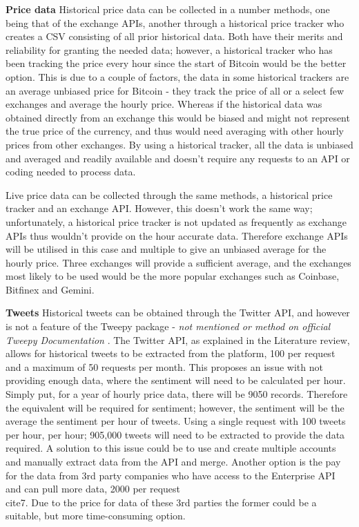 \documentclass[oneside, 12pt]{article}
\begin{document}
		\textbf{Price data}
		\newline
		\newline
		Historical price data can be collected in a number methods, one being that of the exchange APIs, another through a historical price tracker who creates a CSV consisting of all prior historical data. Both have their merits and reliability for granting the needed data; however, a historical tracker who has been tracking the price every hour since the start of Bitcoin would be the better option. This is due to a couple of factors, the data in some historical trackers are an average unbiased price for Bitcoin - they track the price of all or a select few exchanges and average the hourly price. Whereas if the historical data was obtained directly from an exchange this would be biased and might not represent the true price of the currency, and thus would need averaging with other hourly prices from other exchanges. By using a historical tracker, all the data is unbiased and averaged and readily available and doesn't require any requests to an API or coding needed to process data.
		
		Live price data can be collected through the same methods, a historical price tracker and an exchange API. However, this doesn't work the same way; unfortunately, a historical price tracker is not updated as frequently as exchange APIs thus wouldn't provide on the hour accurate data. Therefore exchange APIs will be utilised in this case and multiple to give an unbiased average for the hourly price. Three exchanges will provide a sufficient average, and the exchanges most likely to be used would be the more popular exchanges such as Coinbase, Bitfinex and Gemini.
		\newline
		
		\textbf{Tweets}
		\newline
		\newline
		Historical tweets can be obtained through the Twitter API, and however is not a feature of the Tweepy package - \textit{not mentioned or method on official Tweepy Documentation} \cite{33}. The Twitter API, as explained in the Literature review, allows for historical tweets to be extracted from the platform, 100 per request and a maximum of 50 requests per month. This proposes an issue with not providing enough data, where the sentiment will need to be calculated per hour. Simply put, for a year of hourly price data, there will be 9050 records. Therefore the equivalent will be required for sentiment; however, the sentiment will be the average the sentiment per hour of tweets. Using a single request with 100 tweets per hour, per hour; 905,000 tweets will need to be extracted to provide the data required. A solution to this issue could be to use and create multiple accounts and manually extract data from the API and merge. Another option is the pay for the data from 3rd party companies who have access to the Enterprise API and can pull more data, 2000 per request \\cite{7}\cite{8}. Due to the price for data of these 3rd parties the former could be a suitable, but more time-consuming option. 
		
\end{document}
